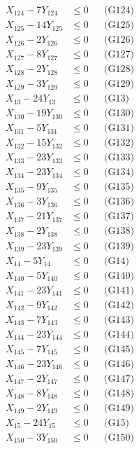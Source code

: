 \documentclass[a4paper,10pt]{article}
\begin{document}
{\begin{align}
X_{124} - 7Y_{124} &\leq 0 && \text{(G124)} \\
X_{125} - 14Y_{125} &\leq 0 && \text{(G125)} \\
X_{126} - 2Y_{126} &\leq 0 && \text{(G126)} \\
X_{127} - 8Y_{127} &\leq 0 && \text{(G127)} \\
X_{128} - 2Y_{128} &\leq 0 && \text{(G128)} \\
X_{129} - 3Y_{129} &\leq 0 && \text{(G129)} \\
X_{13} - 24Y_{13} &\leq 0 && \text{(G13)} \\
X_{130} - 19Y_{130} &\leq 0 && \text{(G130)} \\
X_{131} - 5Y_{131} &\leq 0 && \text{(G131)} \\
X_{132} - 15Y_{132} &\leq 0 && \text{(G132)} \\
X_{133} - 23Y_{133} &\leq 0 && \text{(G133)} \\
\allowbreak
X_{134} - 23Y_{134} &\leq 0 && \text{(G134)} \\
X_{135} - 9Y_{135} &\leq 0 && \text{(G135)} \\
X_{136} - 3Y_{136} &\leq 0 && \text{(G136)} \\
X_{137} - 21Y_{137} &\leq 0 && \text{(G137)} \\
X_{138} - 2Y_{138} &\leq 0 && \text{(G138)} \\
X_{139} - 23Y_{139} &\leq 0 && \text{(G139)} \\
X_{14} - 5Y_{14} &\leq 0 && \text{(G14)} \\
X_{140} - 5Y_{140} &\leq 0 && \text{(G140)} \\
X_{141} - 23Y_{141} &\leq 0 && \text{(G141)} \\
X_{142} - 9Y_{142} &\leq 0 && \text{(G142)} \\
X_{143} - 7Y_{143} &\leq 0 && \text{(G143)} \\
X_{144} - 23Y_{144} &\leq 0 && \text{(G144)} \\
X_{145} - 7Y_{145} &\leq 0 && \text{(G145)} \\
X_{146} - 23Y_{146} &\leq 0 && \text{(G146)} \\
X_{147} - 2Y_{147} &\leq 0 && \text{(G147)} \\
X_{148} - 8Y_{148} &\leq 0 && \text{(G148)} \\
X_{149} - 2Y_{149} &\leq 0 && \text{(G149)} \\
X_{15} - 24Y_{15} &\leq 0 && \text{(G15)} \\
X_{150} - 3Y_{150} &\leq 0 && \text{(G150)} \\

\end{align}}
\end{document}
